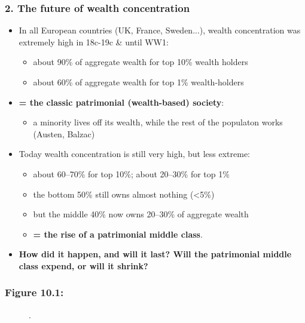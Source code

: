 \documentclass[t]{beamer}\usepackage[]{graphicx}\usepackage[]{color}
\begin{document}
\begin{frame}[label=WealthFuture]
\frametitle{2. The future of wealth concentration}
\begin{itemize}
\item
In all European countries (UK, France, Sweden...), wealth concentration was extremely high in 18c-19c \& until WW1:
\begin{itemize}
\item
about 90\% of aggregate wealth for top 10\% wealth holders
\item
about 60\% of aggregate wealth for top 1\% wealth-holders
\end{itemize}
\item
\textbf{= the classic patrimonial (wealth-based) society}: 
\begin{itemize}
\item
a minority lives off its wealth, while the rest of the populaton works (Austen, Balzac)
\end{itemize}
\item
Today wealth concentration is still very high, but less extreme:\hfill
\begin{itemize}%
\item
about 60--70\% for top 10\%; about 20--30\% for top 1\%
\item
the bottom 50\% still owns almost nothing (<5\%)
\item
but the middle 40\% now owns 20--30\% of aggregate wealth
\item
\textbf{= the rise of a patrimonial middle class}.
\end{itemize}
\item
\textbf{How did it happen, and will it last? Will the patrimonial middle class expend, or will it shrink?}
\end{itemize}
\end{frame}


\begin{frame}[label=Figure_10_1]
\frametitle{Figure 10.1: }
\begin{figure}[t]
\begin{minipage}[b]{\textwidth}
\centering

\caption{.}
\end{minipage}
\end{figure}
\end{frame}
\end{document}
